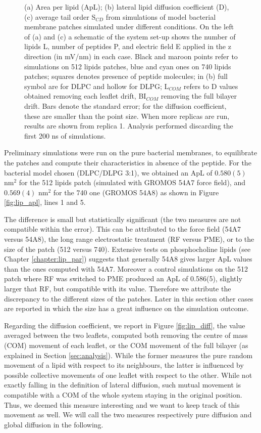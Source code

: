\begin{figure}
\caption[ApL, D and S$_{CD}$ for membrane simulations]{(a) Area per lipid (ApL); (b) lateral lipid diffusion coefficient (D), (c) average tail order S$_{CD}$ from simulations of model bacterial membrane patches simulated under different conditions. On the left of (a) and (c) a schematic of the system set-up shows the number of lipids L, number of peptides P, and electric field E applied in the z direction (in mV/nm) in each case. Black and maroon points refer to simulations on 512 lipids patches, blue and cyan ones on 740 lipids patches; squares denotes presence of peptide molecules; in (b) full symbol are for DLPC and hollow for DLPG; L$_{COM}$ refers to D values obtained removing each leaflet drift, BI$_{COM}$ removing the full bilayer drift. Bars denote the standard error; for the diffusion coefficient, these are smaller than the point size. When more replicas are run, results are shown from replica 1. Analysis performed discarding the first 200 ns of simulations.}
\label{fig:lipids_ApL_D}
\end{figure}

Preliminary simulations were run on the pure bacterial membranes, to equilibrate the patches and compute their characteristics in absence of the peptide.
%
For the bacterial model chosen (DLPC/DLPG 3:1), we obtained an ApL of $0.580(5)$ nm$^2$ for the 512 lipids patch (simulated with GROMOS 54A7 force field), and  $0.569(4)$ nm$^2$ for the 740 one (GROMOS 54A8) as shown in Figure \ref{fig:lip_apl}, lines 1 and 5.

The difference is small but statistically significant (the two measures are not compatible within the error).
%
This can be attributed to the force field (54A7 versus 54A8), the long range electrostatic treatment (RF versus PME), or to the size of the patch (512 versus 740). %
%
Extensive tests on phosphocholine lipids (see Chapter \ref{chapter:lip_par}) suggests that generally 54A8 gives larger ApL values than the ones computed with 54A7.
%
Moreover a control simulations on the 512 patch where RF was switched to PME produced an ApL of 0.586(5), slightly larger that RF, but compatible with its value.
%
Therefore we attribute the discrepancy to the different sizes of the patches. Later in this section other cases are reported in which the size has a great influence on the simulation outcome.

Regarding the diffusion coefficient, we report in Figure \ref{fig:lip_diff}, the value averaged between the two leaflets, computed both removing the centre of mass (COM) movement of each leaflet, or the COM movement of the full bilayer (as explained in Section \ref{sec:analysis}). While the former measures the pure random movement of a lipid with respect to its neighbours, the latter is influenced by possible collective movements of one leaflet with respect to the other. While not exactly falling in the definition of lateral diffusion, such mutual movement is compatible with a COM of the whole system staying in the original position. Thus, we deemed this measure interesting and we want to keep track of this movement as well. We will call the two measures respectively pure diffusion and global diffusion in the following.

